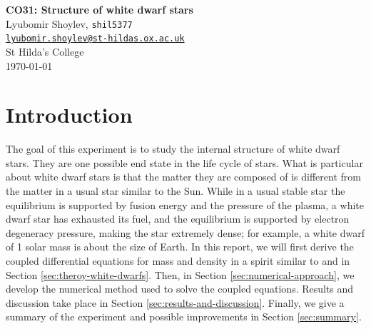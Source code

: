 \documentclass[]{article}
\begin{document}


\begin{center}
	\Large{\textbf{CO31: Structure of white dwarf stars}\\
	\vspace{1em}
	\large{Lyubomir Shoylev, \texttt{shil5377}}\\ \href{mailto:me@example.com}{\texttt{lyubomir.shoylev@st-hildas.ox.ac.uk}}}\\
	\large{St Hilda's College}\\
	\today
\end{center}

\begin{abstract}
	This will be the abstract of the report. It shall be written when the rest is nearly done.
\end{abstract}

\section{Introduction}
	The goal of this experiment is to study the internal structure of white dwarf stars. They are one possible end state in the life cycle of stars. What is particular about white dwarf stars is that the matter they are composed of is different from the matter in a usual star similar to the Sun. While in a usual stable star the equilibrium is supported by fusion energy and the pressure of the plasma, a white dwarf star has exhausted its fuel, and the equilibrium is supported by electron degeneracy pressure, making the star extremely dense; for example, a white dwarf of 1 solar mass is about the size of Earth. In this report, we will first derive the coupled differential equations for mass and density in a spirit similar to \cite{OxfPhys2020} and \cite{Chandrasekhar1984} in Section \ref{sec:theroy-white-dwarfs}. Then, in Section \ref{sec:numerical-approach}, we develop the numerical method used to solve the coupled equations. Results and discussion take place in Section \ref{sec:results-and-discussion}. Finally, we give a summary of the experiment and possible improvements in Section \ref{sec:summary}.
\end{document}
